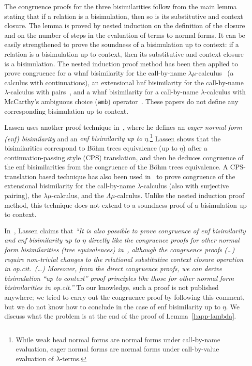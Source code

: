 \documentclass{lmcs}
\theoremstyle{defC}
\begin{document}
The congruence proofs for the three bisimilarities follow from the main lemma
stating that if a relation is a bisimulation, then so is its substitutive and
context closure. The lemma is proved by nested induction on the definition of
the closure and on the number of steps in the evaluation of terms to normal
forms. It can be easily strengthened to prove the soundness of a bisimulation up
to context: if a relation is a bisimulation up to context, then its substitutive
and context closure is a bisimulation.  The nested induction proof method has
been then applied to prove congruence for a whnf bisimilarity for the
call-by-name $\lambda\mu$-calculus~\cite{Lassen:99} (a calculus with
continuations), an extensional hnf bisimilarity for the call-by-name
$\lambda$-calculus with pairs~\cite{Lassen:LICS06}, and a whnf bisimilarity for
a call-by-name $\lambda$-calculus with McCarthy's ambiguous choice ({\tt amb})
operator~\cite{Lassen:MFPS05}. These papers do not define any corresponding
bisimulation up to context.

Lassen uses another proof technique in~\cite{Lassen:LICS05}, where he defines an
\emph{eager normal form (enf) bisimilarity} and an \emph{enf bisimilarity up to
  $\eta$}.\footnote{While weak head normal forms are normal forms under
  call-by-name evaluation, eager normal forms are normal forms under
  call-by-value evaluation of $\lambda$-terms.} Lassen shows that the
bisimilarities correspond to B{\"o}hm trees equivalence (up to $\eta$) after a
continuation-passing style (CPS) translation, and then he deduces congruence of
the enf bisimilarities from the congruence of the B{\"o}hm trees equivalence. A
CPS-translation based technique has also been used in~\cite{Lassen:LICS06} to
prove congruence of the extensional bisimilarity for the call-by-name
$\lambda$-calculus (also with surjective pairing), the $\lambda\mu$-calculus,
and the $\Lambda\mu$-calculus. Unlike the nested induction proof method, this
technique does not extend to a soundness proof of a bisimulation up to context.

In~\cite{Lassen:LICS05}, Lassen claims that \textit{``It is also possible to prove
  congruence of enf bisimilarity and enf bisimilarity up to $\eta$ directly like
  the congruence proofs for other normal form bisimilarities (tree equivalences)
  in~\cite{Lassen:MFPS99}, although the congruence proofs (\dots)  require
  non-trivial changes to the relational substitutive context closure operation
  in op.cit.\ (\dots)  Moreover, from the direct congruence proofs, we can derive
  bisimulation “up to context” proof principles like those for other normal form
  bisimilarities in op.cit.''} To our knowledge, such a proof is not published
anywhere; we tried to carry out the congruence proof by following this comment,
but we do not know how to conclude in the case of enf bisimilarity up to
$\eta$. We discuss what the problem is at the end of the proof of
Lemma~\ref{l:app-lambda}.
\end{document}
